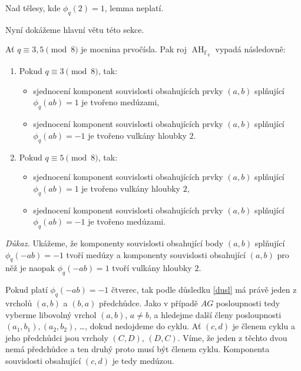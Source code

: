 \documentclass[12pt]{report}
\DeclareMathOperator{\AH}{AH}
\begin{document}
\begin{poznamka}
Nad tělesy, kde $\phi_q(2) =1$, lemma neplatí.
\end{poznamka}

Nyní dokážeme hlavní větu této sekce.

\begin{veta}\label{big}
Ať $q \equiv 3,5 \pmod{8}$ je mocnina prvočísla. Pak roj $\AH_{\mathbb{F}_q}$ vypadá následovně:
\begin{enumerate}
\item Pokud $q \equiv 3 \pmod{8}$, tak:
\begin{itemize}
\item sjednocení komponent souvislosti obsahujících prvky $(a,b)$ splňující $\phi_q(ab) = 1$ je tvořeno medúzami,
\item sjednocení komponent souvislosti obsahujících prvky $(a,b)$ splňující $\phi_q(ab) = -1$ je tvořeno vulkány hloubky $2$.
\end{itemize}
\item Pokud $q \equiv 5 \pmod{8}$, tak:
\begin{itemize}
\item sjednocení komponent souvislosti obsahujících prvky $(a,b)$ splňující $\phi_q(ab) = 1$ je tvořeno vulkány hloubky $2$,
\item sjednocení komponent souvislosti obsahujících prvky $(a,b)$ splňující $\phi_q(ab) = -1$ je tvořeno medúzami.
\end{itemize}
\end{enumerate}

\end{veta}

\noindent \textit{Důkaz.} Ukážeme, že komponenty souvislosti obsahující body $(a,b)$ splňující $\phi_q(-ab) = -1$ tvoří medúzy a komponenty souvislosti obsahující $(a,b)$ pro něž je naopak $\phi_q(-ab)=1$ tvoří vulkány hloubky $2$.


Pokud platí $\phi_q(-ab) =-1$ čtverec, tak podle důsledku \ref{dusl} má právě jeden z vrcholů $(a,b)$ a $(b,a)$ předchůdce. Jako v případě $AG$ posloupnosti tedy vyberme libovolný vrchol $(a,b)$, $a \neq b$, a hledejme další členy posloupnosti $(a_1,b_1), (a_2,b_2)$, \dots, dokud nedojdeme do cyklu. Ať $(c,d)$ je členem cyklu a jeho předchůdci jsou vrcholy $(C,D)$, $(D,C)$. Víme, že jeden z těchto dvou nemá předchůdce a ten druhý proto musí být členem cyklu. Komponenta souvislosti obsahující $(c,d)$ je tedy medúzou.
\end{document}
